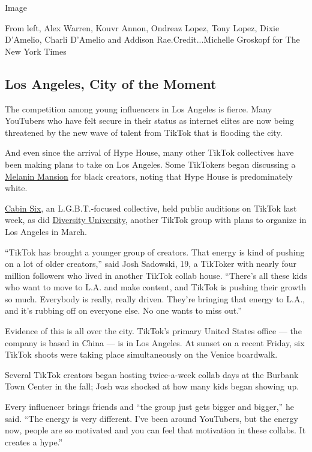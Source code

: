 Image

From left, Alex Warren, Kouvr Annon, Ondreaz Lopez, Tony Lopez, Dixie
D'Amelio, Charli D'Amelio and Addison Rae.Credit...Michelle Groskopf for
The New York Times

\hypertarget{los-angeles-city-of-the-moment}{%
\subsection{Los Angeles, City of the
Moment}\label{los-angeles-city-of-the-moment}}

The competition among young influencers in Los Angeles is fierce. Many
YouTubers who have felt secure in their status as internet elites are
now being threatened by the new wave of talent from TikTok that is
flooding the city.

And even since the arrival of Hype House, many other TikTok collectives
have been making plans to take on Los Angeles. Some TikTokers began
discussing a \href{https://vm.tiktok.com/CP5dyo/}{Melanin Mansion} for
black creators, noting that Hype House is predominately white.

\href{https://vm.tiktok.com/CPfU4x/}{Cabin Six}, an L.G.B.T.-focused
collective, held public auditions on TikTok last week, as did
\href{https://vm.tiktok.com/CP4edb/}{Diversity University}, another
TikTok group with plans to organize in Los Angeles in March.

``TikTok has brought a younger group of creators. That energy is kind of
pushing on a lot of older creators,'' said Josh Sadowski, 19, a TikToker
with nearly four million followers who lived in another TikTok collab
house. ``There's all these kids who want to move to L.A. and make
content, and TikTok is pushing their growth so much. Everybody is
really, really driven. They're bringing that energy to L.A., and it's
rubbing off on everyone else. No one wants to miss out.''

Evidence of this is all over the city. TikTok's primary United States
office --- the company is based in China --- is in Los Angeles. At
sunset on a recent Friday, six TikTok shoots were taking place
simultaneously on the Venice boardwalk.

Several TikTok creators began hosting twice-a-week collab days at the
Burbank Town Center in the fall; Josh was shocked at how many kids began
showing up.

Every influencer brings friends and ``the group just gets bigger and
bigger,'' he said. ``The energy is very different. I've been around
YouTubers, but the energy now, people are so motivated and you can feel
that motivation in these collabs. It creates a hype.''

